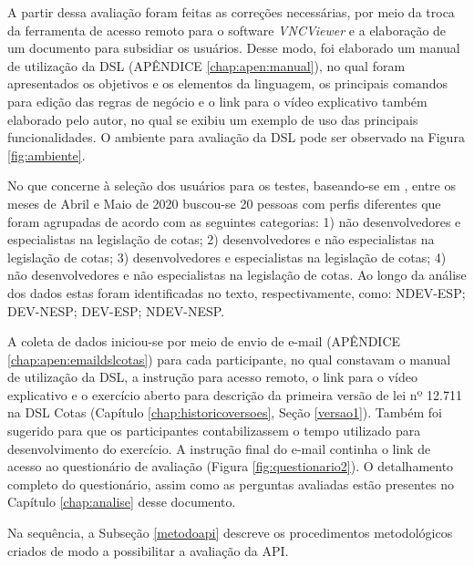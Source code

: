  A partir dessa avaliação foram feitas as correções necessárias, por meio da troca da ferramenta de acesso remoto para o software \textit{VNCViewer} e a elaboração de um documento para subsidiar os usuários. Desse modo, foi elaborado um manual de utilização da DSL (APÊNDICE \ref{chap:apen:manual}), no qual foram apresentados os objetivos e os elementos da linguagem, os principais comandos para edição das regras de negócio e o link para o vídeo explicativo também elaborado pelo autor, no qual se exibiu um exemplo de uso das principais funcionalidades. O ambiente para avaliação da DSL pode ser observado na Figura \ref{fig:ambiente}.
 
 
  
 
 No que concerne à seleção dos usuários para os testes, baseando-se em , entre os meses de Abril e Maio de 2020 buscou-se 20 pessoas com perfis diferentes que foram agrupadas de acordo com as seguintes categorias: 1) não desenvolvedores e especialistas na legislação de cotas; 2) desenvolvedores e não especialistas na legislação de cotas; 3) desenvolvedores e especialistas na legislação de cotas; 4) não desenvolvedores e não especialistas na legislação de cotas. Ao longo da análise dos dados estas foram identificadas no texto, respectivamente, como: NDEV-ESP; DEV-NESP; DEV-ESP; NDEV-NESP. 

 A coleta de dados iniciou-se por meio de envio de e-mail (APÊNDICE \ref{chap:apen:emaildslcotas}) para cada participante, no qual constavam o manual de utilização da DSL, a instrução para acesso remoto, o link para o vídeo explicativo e o exercício aberto para descrição da primeira versão de lei nº 12.711 na DSL Cotas (Capítulo \ref{chap:historicoversoes}, Seção \ref{versao1}). Também foi sugerido para que os participantes contabilizassem o tempo utilizado para desenvolvimento do exercício. A instrução final do e-mail continha o link de acesso ao questionário de avaliação (Figura \ref{fig:questionario2}). O detalhamento completo do questionário, assim como as perguntas avaliadas estão presentes no Capítulo \ref{chap:analise} desse documento.

 
 
 \newpage
 Na sequência, a Subseção \ref{metodoapi} descreve os procedimentos metodológicos criados de modo a possibilitar a avaliação da \gls{API}.
 

